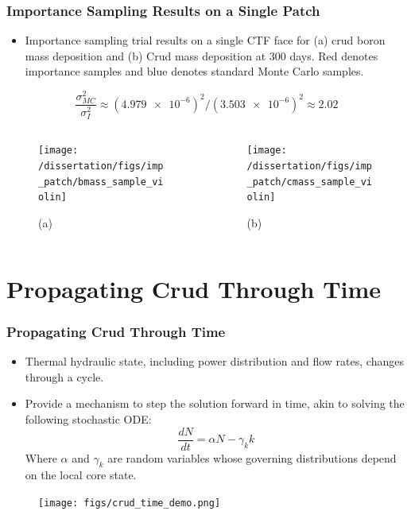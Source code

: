\documentclass[t, pdftex]{beamer}
\begin{document}
\begin{frame}
\frametitle{\small Importance Sampling Results on a Single Patch}
\vspace{-16pt}
\begin{itemize}
    \item Importance sampling trial results on a single CTF face for (a) crud boron mass deposition and (b) Crud mass deposition at 300 days.  Red denotes importance samples and blue denotes standard Monte Carlo samples.  
\end{itemize}
\[ \frac{\sigma^2_{MC}}{\sigma^2_{I}} \approx (\num{4.979e-6})^2 / (\num{3.503e-6})^2  \approx 2.02 \]
\vspace{-28pt}
\begin{columns}
    \begin{column}{0.5\textwidth}
\begin{figure}[]
    \centering
    \texttt{[image: /dissertation/figs/imp\_patch/bmass\_sample\_violin]}
    \caption{\centering (a)}
    \label{model_overview}
\end{figure}
\end{column}
\begin{column}{0.5\textwidth}
\begin{figure}[]
    \centering
    \texttt{[image: /dissertation/figs/imp\_patch/cmass\_sample\_violin]}\\
    \caption{\centering (b)}
    \label{model_overview}
\end{figure}
\end{column}
\end{columns}
\end{frame}


\section[Time Stepping]{Propagating Crud Through Time}
\begin{frame}
\frametitle{Propagating Crud Through Time}
\vspace{-16pt}
\begin{itemize}
    \item Thermal hydraulic state, including power distribution and flow rates, changes through a cycle.  
    \item Provide a mechanism to step the solution forward in time, akin to solving the following stochastic ODE:
    \[
    \frac{d N}{d t} = \alpha N - \gamma_k k
    \]
    Where $\alpha$ and $\gamma_k$ are random variables whose governing distributions depend on the local core state.
\end{itemize}

\begin{figure}[]
\centering
\texttt{[image: figs/crud\_time\_demo.png]}
\label{model_overview}
\end{figure}
\end{frame}
\end{document}
